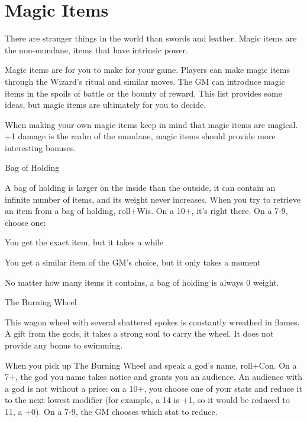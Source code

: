 \chapter{Magic Items}
   
       

There are stranger things in the world than swords and leather. Magic items are the non-mundane, items that have intrinsic power.

       

Magic items are for you to make for your game. Players can make magic items through the Wizard's ritual and similar moves. The GM can introduce magic items in the spoils of battle or the bounty of reward. This list provides some ideas, but magic items are ultimately for you to decide.

       

When making your own magic items keep in mind that magic items are magical. +1 damage is the realm of the mundane, magic items should provide more interesting bonuses.

       

Bag of Holding	 

       

A bag of holding is larger on the inside than the outside, it can contain an infinite number of items, and its weight never increases. When you try to retrieve an item from a bag of holding, roll+Wis. On a 10+, it's right there. On a 7-9, choose one:

       
\startitemize[1,packed]
         
\item You get the exact item, but it takes a while

         
\item You get a similar item of the GM's choice, but it only takes a moment

       
\stopitemize
       

No matter how many items it contains, a bag of holding is always 0 weight.

       

The Burning Wheel	 

       

This wagon wheel with several shattered spokes is constantly wreathed in flames. A gift from the gods, it takes a strong soul to carry the wheel. It does not provide any bonus to swimming.

       

When you pick up The Burning Wheel and speak a god's name, roll+Con. On a 7+, the god you name takes notice and grants you an audience. An audience with a god is not without a price: on a 10+, you choose one of your stats and reduce it to the next lowest modifier (for example, a 14 is +1, so it would be reduced to 11, a +0). On a 7-9, the GM chooses which stat to reduce.

